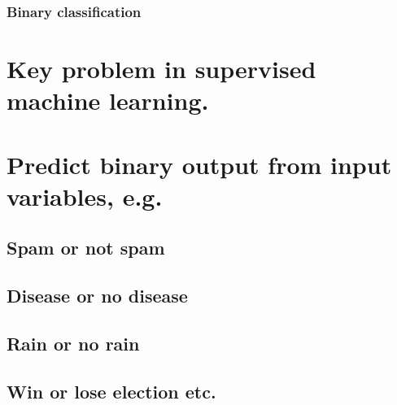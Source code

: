 \documentclass{beamer}
\begin{document}
\begin{frame}
\frametitle{Binary classification} %
\tableofcontents %
\section{Key problem in supervised machine learning.}
\section{Predict binary output from input variables, e.g.}
\subsection{Spam or not spam}
\subsection{Disease or no disease}
\subsection{Rain or no rain}
\subsection{Win or lose election etc.}


\end{frame}
\end{document}
